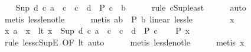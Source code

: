 \begin{isabellebody}
\isamarkupfalse%
\isanewline
\ \ \isamarkupfalse%
\ {\isachardoublequoteopen}Sup\ {\isacharbraceleft}{\kern0pt}d{\isachardot}{\kern0pt}\ {\isasymforall}c{\isachardot}{\kern0pt}\ a\ {\isasymle}\ c\ {\isasymand}\ c\ {\isacharless}{\kern0pt}\ d\ {\isasymlongrightarrow}\ P\ c{\isacharbraceright}{\kern0pt}\ {\isasymle}\ b{\isachardoublequoteclose}\isanewline
\ \ \ \ \isamarkupfalse%
\ {\isacharparenleft}{\kern0pt}rule\ cSup{\isacharunderscore}{\kern0pt}least{\isacharparenright}{\kern0pt}\isanewline
\ \ \ \ \isamarkupfalse%
\ auto\isanewline
\ \ \ \ \isamarkupfalse%
\ {\isacharparenleft}{\kern0pt}metis\ less{\isacharunderscore}{\kern0pt}le{\isacharunderscore}{\kern0pt}not{\isacharunderscore}{\kern0pt}le{\isacharparenright}{\kern0pt}\isanewline
\ \ \ \ \isamarkupfalse%
\ {\isacharparenleft}{\kern0pt}metis\ {\isacartoucheopen}a{\isacharless}{\kern0pt}b{\isacartoucheclose}\ {\isacartoucheopen}{\isasymnot}\ P\ b{\isacartoucheclose}\ linear\ less{\isacharunderscore}{\kern0pt}le{\isacharparenright}{\kern0pt}\isanewline
\ \ \ \ \isamarkupfalse%
\isanewline
{}\isamarkupfalse%
\isanewline
\ \ \isamarkupfalse%
\ x\isanewline
\ \ \isamarkupfalse%
\ x{\isacharcolon}{\kern0pt}\ {\isachardoublequoteopen}a\ {\isasymle}\ x{\isachardoublequoteclose}\ \ lt{\isacharcolon}{\kern0pt}\ {\isachardoublequoteopen}x\ {\isacharless}{\kern0pt}\ Sup\ {\isacharbraceleft}{\kern0pt}d{\isachardot}{\kern0pt}\ {\isasymforall}c{\isachardot}{\kern0pt}\ a\ {\isasymle}\ c\ {\isasymand}\ c\ {\isacharless}{\kern0pt}\ d\ {\isasymlongrightarrow}\ P\ c{\isacharbraceright}{\kern0pt}{\isachardoublequoteclose}\isanewline
\ \ \isamarkupfalse%
\ {\isachardoublequoteopen}P\ x{\isachardoublequoteclose}\isanewline
\ \ \ \ \isamarkupfalse%
\ {\isacharparenleft}{\kern0pt}rule\ less{\isacharunderscore}{\kern0pt}cSupE\ {\isacharbrackleft}{\kern0pt}OF\ lt{\isacharbrackright}{\kern0pt}{\isacharcomma}{\kern0pt}\ auto{\isacharparenright}{\kern0pt}\isanewline
\ \ \ \ \isamarkupfalse%
\ {\isacharparenleft}{\kern0pt}metis\ less{\isacharunderscore}{\kern0pt}le{\isacharunderscore}{\kern0pt}not{\isacharunderscore}{\kern0pt}le{\isacharparenright}{\kern0pt}\isanewline
\ \ \ \ \isamarkupfalse%
\ {\isacharparenleft}{\kern0pt}metis\ x{\isacharparenright}{\kern0pt}\isanewline
\ \ \ \ \isamarkupfalse%
\isanewline
{}\isamarkupfalse%
\isanewline
\ \ \isamarkupfalse%

\end{isabellebody}
